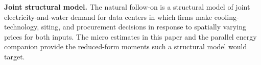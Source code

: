 \documentclass[11pt, letterpaper]{article}
\begin{document}
\textbf{Joint structural model.} The natural follow-on is a structural model of joint electricity-and-water demand for data centers in which firms make cooling-technology, siting, and procurement decisions in response to spatially varying prices for both inputs. The micro estimates in this paper and the parallel energy companion provide the reduced-form moments such a structural model would target.



\end{document}
